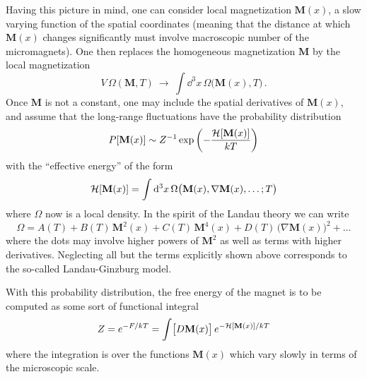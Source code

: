 Having this picture in mind, one can consider local magnetization
$\mathbf M(x)$, a slow varying function of the spatial coordinates (meaning that
the distance at which $\mathbf M(x)$ changes significantly must involve
macroscopic number of the micromagnets). One then replaces the homogeneous
magnetization $\mathbf M$ by the local magnetization
\[
V\,\Omega(\mathbf M,T)\ \to\ \int \dd^3x\,\Omega\bigl(\mathbf M(x),T\bigr)\,.
\]
Once $\mathbf M$ is not a constant, one may include the spatial derivatives of
$\mathbf M(x)$, and assume that the long-range fluctuations have the probability
distribution
\[
P[\mathbf M(x)]\sim Z^{-1}\exp\left(-\frac{\mathcal{H}[\mathbf M(x)]}{kT}\right)
\]
with the ``effective energy'' of the form
\[
\mathcal{H}[\mathbf M(x)]=\int \mathop{}\!\mathrm{d}^3x\,\Omega\bigl(\mathbf M(x),\nabla\mathbf M(x),\dots;T\bigr)
\]
where $\Omega$ now is a local density. In the spirit of the Landau theory we can
write
\[
\Omega=A(T)+B(T)\,\mathbf M^2(x)+C(T)\,\mathbf M^4(x)+D(T)\,\bigl(\nabla\mathbf M(x)\bigr)^2+\dots
\]
where the dots may involve higher powers of $\mathbf M^2$ as well as terms with
higher derivatives. Neglecting all but the terms explicitly shown above
corresponds to the so-called Landau-Ginzburg model.

With this probability distribution, the free energy of the magnet is to be
computed as some sort of functional integral
\[
Z=e^{-F/kT}=\int\bigl[D\mathbf M(x)\bigr]\,e^{-\mathcal{H}[\mathbf M(x)]/kT}
\]
where the integration is over the functions $\mathbf M(x)$ which vary slowly in
terms of the microscopic scale.

